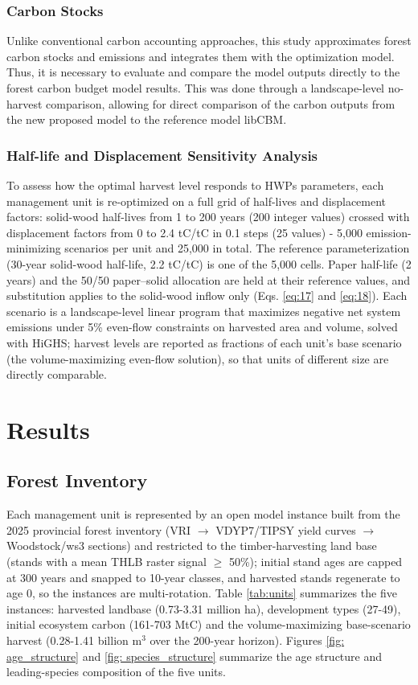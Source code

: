 \documentclass[preprint,12pt,authoryear]{elsarticle}
\begin{document}
\begin{linenumbers}
\subsubsection{Carbon Stocks}
Unlike conventional carbon accounting approaches, this study approximates forest carbon stocks and emissions and integrates them with the optimization model. Thus, it is necessary to evaluate and compare the model outputs directly to the forest carbon budget model results. This was done through a landscape-level no-harvest comparison, allowing for direct comparison of the carbon outputs from the new proposed model to the reference model libCBM.

\subsubsection{Half-life and Displacement Sensitivity Analysis}
To assess how the optimal harvest level responds to \acp{HWP} parameters, each management unit is re-optimized on a full grid of half-lives and displacement factors: solid-wood half-lives from 1 to 200 years (200 integer values) crossed with displacement factors from 0 to 2.4 tC/tC in 0.1 steps (25 values) - 5,000 emission-minimizing scenarios per unit and 25,000 in total. The reference parameterization (30-year solid-wood half-life, 2.2 tC/tC) is one of the 5,000 cells. Paper half-life (2 years) and the 50/50 paper--solid allocation are held at their reference values, and substitution applies to the solid-wood inflow only (Eqs. \ref{eq:17} and \ref{eq:18}). Each scenario is a landscape-level linear program that maximizes negative net system emissions under 5\% even-flow constraints on harvested area and volume, solved with HiGHS; harvest levels are reported as fractions of each unit's base scenario (the volume-maximizing even-flow solution), so that units of different size are directly comparable. 
\section{Results}
\label{sec:results}
\subsection{Forest Inventory}
Each management unit is represented by an open model instance built from the 2025 provincial forest inventory (\ac{VRI} $\rightarrow$ VDYP7/TIPSY yield curves $\rightarrow$ Woodstock/ws3 sections) and restricted to the timber-harvesting land base (stands with a mean \ac{THLB} raster signal $\geq$ 50\%); initial stand ages are capped at 300 years and snapped to 10-year classes, and harvested stands regenerate to age 0, so the instances are multi-rotation. Table \ref{tab:units} summarizes the five instances: harvested landbase (0.73-3.31 million ha), development types (27-49), initial ecosystem carbon (161-703 MtC) and the volume-maximizing base-scenario harvest (0.28-1.41 billion m$^3$ over the 200-year horizon). Figures \ref{fig: age_structure} and \ref{fig: species_structure} summarize the age structure and leading-species composition of the five units.



\end{linenumbers}
\end{document}
